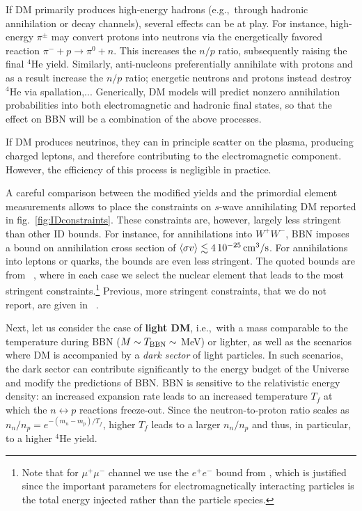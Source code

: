 If DM primarily produces high-energy hadrons (e.g.,~through hadronic annihilation or decay channels), several effects can be at play. For instance, high-energy $\pi^\pm$ may convert protons into neutrons via the energetically favored reaction $\pi^- + p \to \pi^0 + n$.  
This increases the $n/p$ ratio, subsequently raising the final $^4$He yield.
Similarly, anti-nucleons  preferentially annihilate with protons and as a result increase the $n/p$ ratio; energetic neutrons and protons instead destroy $^4$He via spallation,... 
Generically, DM models will predict nonzero annihilation probabilities into both electromagnetic and hadronic final states, so that 
the effect on BBN will be a combination of the above processes.  

If DM produces neutrinos, they can in principle  scatter on the plasma, producing charged leptons, and therefore contributing to the electromagnetic component. However,  the efficiency of this process is negligible in practice.


A careful comparison between the modified yields and the primordial element measurements allows to place the constraints on $s$-wave annihilating DM reported in fig.~\ref{fig:IDconstraints}. These constraints are, however, largely less stringent than other ID bounds. For instance, for annihilations into $W^+W^-$, BBN imposes a bound on annihilation cross section of $\langle \sigma v \rangle \lesssim 4 \, 10^{-25} \, {\rm cm}^3/{\rm s}$. For annihilations into leptons or quarks, the bounds are even less stringent. 
The quoted bounds are from ~\cite{BBNbounds}, 
where in each case we select the nuclear element that leads to the most stringent constraints.\footnote{Note that for $\mu^+\mu^-$ channel we use the $e^+e^-$ bound from , which is justified since the important parameters for electromagnetically interacting particles is the total energy injected rather than the particle species.} Previous, more stringent constraints, that we do not report, are given in ~\cite{BBNbounds}. 

\medskip

Next, let us consider the case of {\bf light DM}, i.e.,~with a mass comparable to the temperature during BBN ($M \sim T_{\rm BBN} \sim$ MeV) or lighter, as well as the scenarios where DM is accompanied by a {\em dark sector} of light particles. In such scenarios,  the dark sector can contribute significantly to the energy budget of the Universe and modify the predictions of BBN.  BBN is sensitive to the relativistic energy density: an increased expansion rate leads to an increased temperature $T_f$ at which the $n \leftrightarrow p$ reactions freeze-out. Since the neutron-to-proton ratio scales as $n_n/n_p = e^{-(m_n-m_p)/T_f}$, higher $T_f$ leads to a larger $n_n/n_p$ and thus, in particular, to a higher $^4$He yield. 


